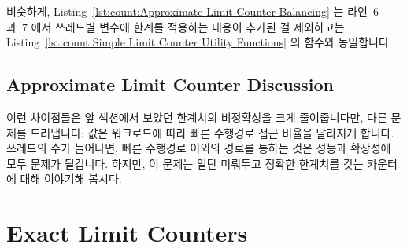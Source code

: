 비슷하게,
Listing~\ref{lst:count:Approximate Limit Counter Balancing} 는 라인~6 과~7 에서
쓰레드별  변수에  한계를 적용하는 내용이
추가된 걸 제외하고는
Listing~\ref{lst:count:Simple Limit Counter Utility Functions} 의
 함수와 동일합니다.

\subsection{Approximate Limit Counter Discussion}

이런 차이점들은 앞 섹션에서 보았던 한계치의 비정확성을 크게 줄여줍니다만, 다른
문제를 드러냅니다:  값은 워크로드에 따라 빠른 수행경로 접근
비율을 달라지게 합니다.
쓰레드의 수가 늘어나면, 빠른 수행경로 이외의 경로를 통하는 것은 성능과 확장성에
모두 문제가 될겁니다.
하지만, 이 문제는 일단 미뤄두고 정확한 한계치를 갖는 카운터에 대해 이야기해
봅시다.

\section{Exact Limit Counters}
\label{sec:count:Exact Limit Counters}

